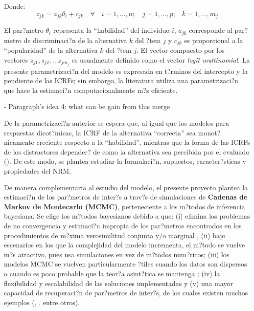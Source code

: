 Donde:
\begin{equation*}
z_{jk} = a_{jk}\theta_i + c_{jk} \quad \forall \quad i = 1, \dots, n; \quad j = 1, \dots, p \text{;} \quad k = 1, \dots, m_j
\end{equation*}

El par?metro $\theta_i$ representa la ``habilidad'' del individuo $i$, $a_{jk}$ corresponde al par?metro de discriminaci?n de la alternativa $k$ del ?tem $j$ y $c_{jk}$ es proporcional a la ``popularidad'' de la alternativa $k$ del ?tem $j$. El vector compuesto por los vectores $z_{j1}, z_{j2}, \dots z_{j m_j}$ es usualmente definido como el vector \textit{logit multinomial}. La presente parametrizaci?n del modelo es expresada en t?rminos del intercepto y la pendiente de las ICRFs; sin embargo, la literatura utiliza una parametrizaci?n que hace la estimaci?n computacionalmente m?s eficiente.



- Paragraph's idea 4: what can be gain from this merge

De la parametrizaci?n anterior se espera que, al igual que los modelos para respuestas dicot?micas, la ICRF de la alternativa ``correcta'' sea monot?nicamente creciente respecto a la ``habilidad'', mientras que la forma de las ICRFs de los distractores depender? de como la alternativa sea percibida por el evaluado (\citealp{Ham_Swam1991}). De este modo, se plantea estudiar la formulaci?n, supuestos, caracter?sticas y propiedades del NRM.

De manera complementaria al estudio del modelo, el presente proyecto plantea la estimaci?n de los par?metros de inter?s a trav?s de simulaciones de \textbf{Cadenas de Markov de Montecarlo (MCMC)}, perteneciente a los m?todos de inferencia bayesiana. Se elige los m?todos bayesianos debido a que: (i) elimina los problemas de no convergencia y estimaci?n impropia de los par?metros encontrados en los procedimientos de m?xima verosimilitud conjunta y/o marginal \citep{Ham_Swam_Rog1991}, (ii) bajo escenarios en los que la complejidad del modelo incrementa, el m?todo se vuelve m?s atractivo, pues usa simulaciones en vez de m?todos num?ricos; (iii) los modelos MCMC se vuelven particularmente ?tiles cuando los datos son dispersos o cuando es poco probable que la teor?a asint?tica se mantenga \citep{Fox2010}; (iv) la flexibilidad y escalabilidad de las soluciones implementadas y (v) una mayor capacidad de recuperaci?n de par?metros de inter?s, de los cuales existen muchos ejemplos (\citealp{Hsi_Proc_Hou_Teo2010}, \citealp{Tarazona2013}, entre otros).



